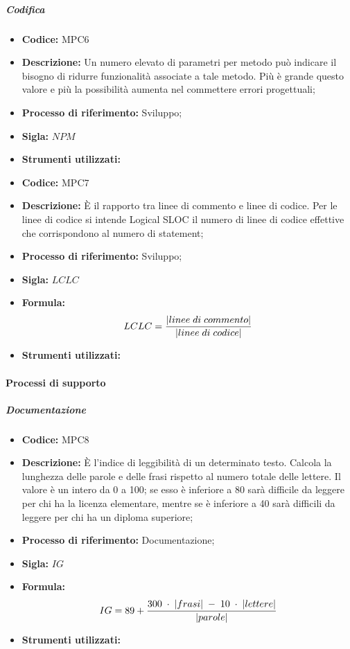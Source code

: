 \subparagraph{Codifica}
    \begin{itemize}
        \item \textbf{Codice:} MPC6
        \item \textbf{Descrizione:} Un numero elevato di parametri per metodo può indicare il bisogno di ridurre funzionalità associate a tale metodo. Più è grande questo valore e più la possibilità aumenta nel commettere errori progettuali;
        \item \textbf{Processo di riferimento:} Sviluppo;
        \item \textbf{Sigla:} $NPM$
        \item \textbf{Strumenti utilizzati:}
    \end{itemize}

    \begin{itemize}
        \item \textbf{Codice:} MPC7
        \item \textbf{Descrizione:} È il rapporto tra linee di commento e linee di codice. Per le linee di codice si intende Logical SLOC il numero di linee di codice effettive che corrispondono al numero di statement;
        \item \textbf{Processo di riferimento:} Sviluppo;
        \item \textbf{Sigla:} $LCLC$
        \item \textbf{Formula:}$$LCLC = {|linee \; di \; commento| \over |linee \; di \; codice|}$$
        \item \textbf{Strumenti utilizzati:}
    \end{itemize}
\paragraph{Processi di supporto}
\subparagraph{Documentazione}
\begin{itemize}
	\item \textbf{Codice:} MPC8
	\item \textbf{Descrizione:} È l'indice di leggibilità di un determinato testo. Calcola la lunghezza delle parole e delle frasi rispetto al numero totale delle lettere. Il valore è un intero da 0 a 100; se esso è inferiore a 80 sarà difficile da leggere per chi ha la licenza elementare, mentre se è inferiore a 40 sarà difficili da leggere per chi ha un diploma superiore;
	\item \textbf{Processo di riferimento:} Documentazione;
	\item \textbf{Sigla:} $IG$
	\item \textbf{Formula:} $$IG = 89 + {{300 \; \cdot \; |frasi| \; - \; 10 \; \cdot \; |lettere|}\over |parole|}$$
	\item \textbf{Strumenti utilizzati:}
\end{itemize}

